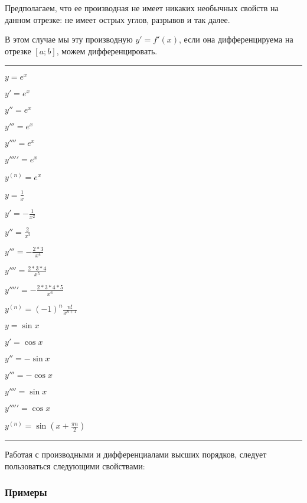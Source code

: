 \documentclass{article}
\begin{document}
\begin{flushleft}
Предполагаем, что ее производная не имеет никаких необычных свойств на данном отрезке: не имеет острых углов, разрывов и так далее.

В этом случае мы эту производную $y' = f'(x)$, если она дифференцируема на отрезке $[ a; b ]$, можем дифференцировать.

\hfill

\rule{\textwidth}{0.2pt}
\parbox{0.33\textwidth}{
$y = e^x$

$y' = e^x$

$y'' = e^x$

$y''' = e^x$

$y'''' = e^x$

$y''''' = e^x$

$y^{(n)} = e^x$
}
\parbox{0.33\textwidth}{
$y = \frac{1}{x}$

$y' = - \frac{1}{x^2}$

$y'' = \frac{2}{x^3}$

$y''' = - \frac{2 * 3}{x^4}$

$y'''' = \frac{2 * 3 * 4}{x^5}$

$y''''' = -\frac{2 * 3 * 4 * 5}{x^6}$

$y^{(n)} = (-1)^n \frac{n!}{x^{n+1}}$
}
\parbox{0.3\textwidth}{
$y = \sin x$

$y' = \cos x$

$y'' = - \sin x$

$y''' = - \cos x$

$y'''' = \sin x$

$y''''' = \cos x$

$y^{(n)} = \sin (x + \frac{\pi n}{2})$
}

\rule{\textwidth}{0.2pt}

\hfill

Работая с производными и дифференциалами высших порядков, следует пользоваться следующими свойствами:

\begin{multienumerate}
\end{multienumerate}

\subsubsection{Примеры}


\end{flushleft}
\end{document}
